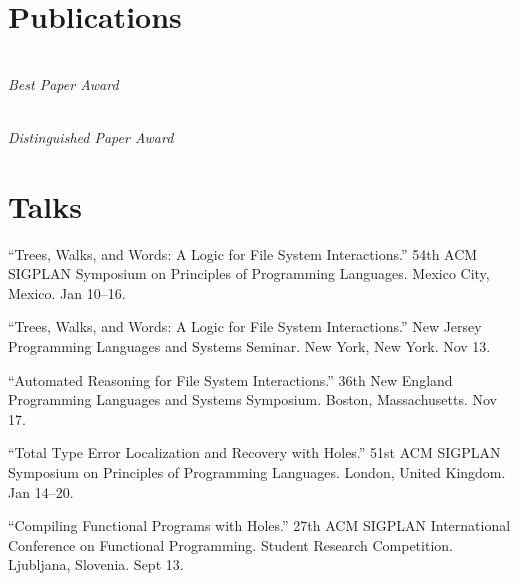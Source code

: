 \documentclass[11pt,letterpaper]{report} %
\begin{document}
\section*{Publications}
\newcommand{\award}[1]{\\[0.1em]\emph{#1}}
\begin{tablist}
  \item[2027] \tab{}

  \item[2026] \tab{} \award{Best Paper Award}

  \item[2025] \tab{}

  \item[] \tab{}

  \item[2024] \tab{} \award{Distinguished Paper Award}
\end{tablist}

\section*{Talks}
\begin{tablist}
  \item[2027] \tab{}\enquote{Trees, Walks, and Words: A Logic for File System Interactions.}
      54th ACM SIGPLAN Symposium on Principles of Programming Languages.
      Mexico City, Mexico. Jan 10--16.

  \item[2026] \tab{}\enquote{Trees, Walks, and Words: A Logic for File System Interactions.}
      New Jersey Programming Languages and Systems Seminar.
      New York, New York. Nov 13.

  \item[2025] \tab{}\enquote{Automated Reasoning for File System Interactions.}
      36th New England Programming Languages and Systems Symposium.
      Boston, Massachusetts. Nov 17.

  \item[2024] \tab{}\enquote{Total Type Error Localization and Recovery with Holes.}
      51st ACM SIGPLAN Symposium on Principles of Programming Languages.
      London, United Kingdom. Jan 14--20.

  \item[2022] \tab{}\enquote{Compiling Functional Programs with Holes.}
      27th ACM SIGPLAN International Conference on Functional Programming.
      Student Research Competition.
      Ljubljana, Slovenia. Sept 13.
\end{tablist}
\end{document}
